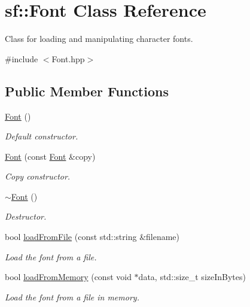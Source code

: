\hypertarget{classsf_1_1Font}{\section{sf\-:\-:Font Class Reference}
\label{classsf_1_1Font}
}


Class for loading and manipulating character fonts.  




{\ttfamily \#include $<$Font.\-hpp$>$}

\subsection*{Public Member Functions}
\begin{DoxyCompactItemize}
\item 
\hyperlink{classsf_1_1Font_a506404655b8869ed60d1e7709812f583}{Font} ()
\begin{DoxyCompactList}\small\item\em Default constructor. \end{DoxyCompactList}\item 
\hyperlink{classsf_1_1Font_a72d7322b355ee2f1be4500f530e98081}{Font} (const \hyperlink{classsf_1_1Font}{Font} \&copy)
\begin{DoxyCompactList}\small\item\em Copy constructor. \end{DoxyCompactList}\item 
\hyperlink{classsf_1_1Font_aa18a3c62e6e01e9a21c531b5cad4b7f2}{$\sim$\-Font} ()
\begin{DoxyCompactList}\small\item\em Destructor. \end{DoxyCompactList}\item 
bool \hyperlink{classsf_1_1Font_ab020052ef4e01f6c749a85571c0f3fd1}{load\-From\-File} (const std\-::string \&filename)
\begin{DoxyCompactList}\small\item\em Load the font from a file. \end{DoxyCompactList}\item 
bool \hyperlink{classsf_1_1Font_abf2f8d6de31eb4e1db02e061c323e346}{load\-From\-Memory} (const void $\ast$data, std\-::size\-\_\-t size\-In\-Bytes)
\begin{DoxyCompactList}\small\item\em Load the font from a file in memory. \end{DoxyCompactList}\item 

\end{DoxyCompactItemize}
